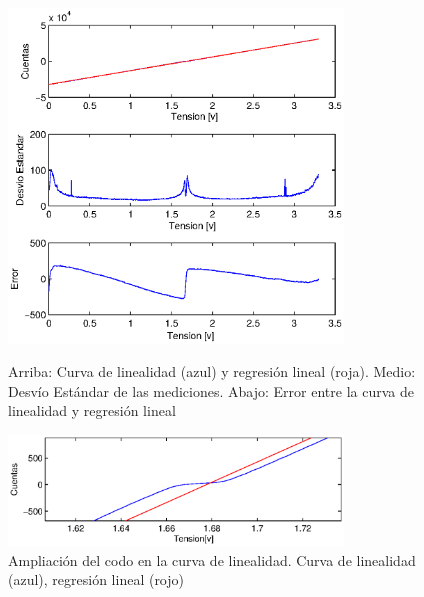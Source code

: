 \documentclass[a4paper,conference]{IEEEtran}
\begin{document}
\begin{figure}[!b]
\centering
\includegraphics[width=3.5in]{Linealidad}
\caption{Arriba: Curva de linealidad (azul) y regresión lineal (roja). Medio: Desvío Estándar de las mediciones. Abajo: Error entre la curva de linealidad y regresión lineal}

\label{fig:lin}
	\centering
	\includegraphics[width=3.5in]{Linealidad_codo}
	\caption{Ampliación del codo en la curva de linealidad. Curva de linealidad (azul), regresión lineal (rojo)}
	
	\label{fig:lincodo}
\end{figure}
\end{document}
